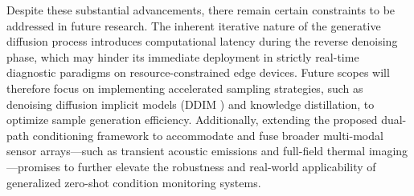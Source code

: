 Despite these substantial advancements, there remain certain constraints to be addressed in future research. The inherent iterative nature of the generative diffusion process introduces computational latency during the reverse denoising phase, which may hinder its immediate deployment in strictly real-time diagnostic paradigms on resource-constrained edge devices. Future scopes will therefore focus on implementing accelerated sampling strategies, such as denoising diffusion implicit models (DDIM \cite{song2021denoising}) and knowledge distillation, to optimize sample generation efficiency. Additionally, extending the proposed dual-path conditioning framework to accommodate and fuse broader multi-modal sensor arrays—such as transient acoustic emissions and full-field thermal imaging—promises to further elevate the robustness and real-world applicability of generalized zero-shot condition monitoring systems.

